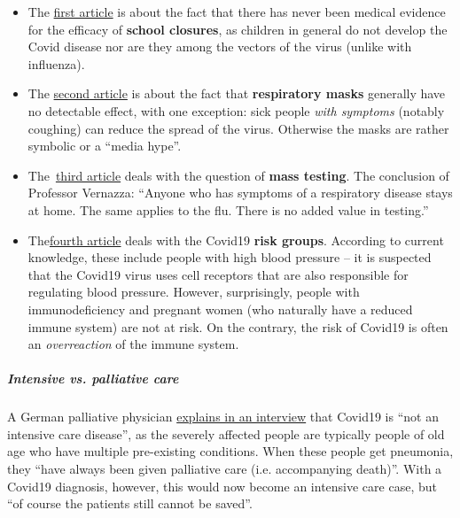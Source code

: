 \begin{itemize}
\tightlist
\item
  The
  \href{https://infekt.ch/2020/04/schulen-schliessen-hilfreich-oder-nicht/}{first
  article} is about the fact that there has never been medical evidence
  for the efficacy of \textbf{school closures}, as children in general
  do not develop the Covid disease nor are they among the vectors of the
  virus (unlike with influenza).
\item
  The
  \href{https://infekt.ch/2020/04/atemschutzmasken-fuer-alle-medienhype-oder-unverzichtbar/}{second
  article} is about the fact that \textbf{respiratory masks} generally
  have no detectable effect, with one exception: sick people \emph{with
  symptoms} (notably coughing) can reduce the spread of the virus.
  Otherwise the masks are rather symbolic or a ``media hype''.
\item
  The~\href{https://infekt.ch/2020/04/corona-testen-testen-und-kein-ende/}{third
  article} deals with the question of \textbf{mass testing}. The
  conclusion of Professor Vernazza: ``Anyone who has symptoms of a
  respiratory disease stays at home. The same applies to the flu. There
  is no added value in testing.''
\item
  The\href{https://infekt.ch/2020/03/immunschwaeche-und-schwangerschaft-kein-covid-19-risikofaktor/}{fourth
  article} deals with the Covid19 \textbf{risk groups}. According to
  current knowledge, these include people with high blood pressure -- it
  is suspected that the Covid19 virus uses cell receptors that are also
  responsible for regulating blood pressure. However, surprisingly,
  people with immunodeficiency and pregnant women (who naturally have a
  reduced immune system) are not at risk. On the contrary, the risk of
  Covid19 is often an \emph{overreaction} of the immune system.
\end{itemize}

\hypertarget{intensive-vs-palliative-care}{%
\subparagraph{\texorpdfstring{\textbf{Intensive vs. palliative
care}}{Intensive vs. palliative care}}\label{intensive-vs-palliative-care}}

A German palliative physician
\href{https://www.ruhr24.de/ruhrgebiet/coronavirus-behandlung-intensivstation-nrw-lungenentzuendung-matthias-thoens-witten-zr-13645038.html}{explains
in an interview} that Covid19 is ``not an intensive care disease'', as
the severely affected people are typically people of old age who have
multiple pre-existing conditions. When these people get pneumonia, they
``have always been given palliative care (i.e. accompanying death)''.
With a Covid19 diagnosis, however, this would now become an intensive
care case, but ``of course the patients still cannot be saved''.


